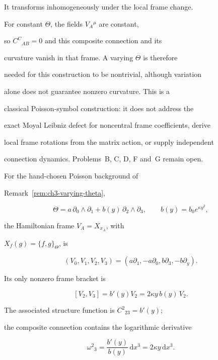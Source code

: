It transforms inhomogeneously under the local frame change.



For constant \(\Theta\), the fields \(V_A{}^\mu\) are constant,

so \(C^C{}_{AB}=0\) and this composite connection and its

curvature vanish in that frame. A varying \(\Theta\) is therefore

needed for this construction to be nontrivial, although variation

alone does not guarantee nonzero curvature. This is a

classical Poisson-symbol construction: it does not address the

exact Moyal Leibniz defect for noncentral frame coefficients, derive

local frame rotations from the matrix action, or supply independent

connection dynamics. Problems~B, C, D, F and~G remain open.



For the hand-chosen Poisson background of

Remark~\ref{rem:ch3-varying-theta},

\[

  \Theta=a\,\partial_0\wedge\partial_1

         +b(y)\,\partial_2\wedge\partial_3,

  \qquad b(y)=b_0e^{\kappa y^2},

\]

the Hamiltonian frame \(V_A=X_{x_A}\), with

\(X_f(g)=\{f,g\}_\Theta\), is

\[

  (V_0,V_1,V_2,V_3)

  =(a\partial_1,-a\partial_0,b\partial_3,-b\partial_y).

\]

Its only nonzero frame bracket is

\[

  [V_2,V_3]=b'(y)V_2=2\kappa y\,b(y)\,V_2.

\]

The associated structure function is \(C^2{}_{23}=b'(y)\);

the composite connection contains the logarithmic derivative

\[

  \omega^2{}_3=\frac{b'(y)}{b(y)}\,\mathrm{d}x^3

  =2\kappa y\,\mathrm{d}x^3.

\]

